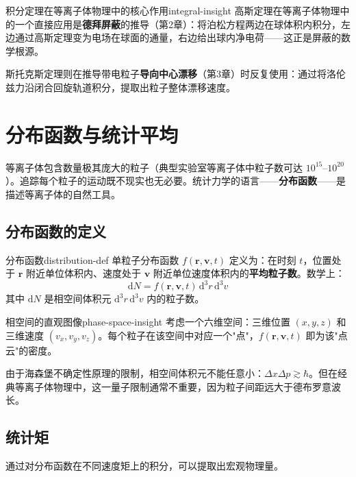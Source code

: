 \documentclass[12pt,a4paper,openany,oneside]{book}
\newcommand{\diff}{\mathrm{d}}
\newcommand{\vect}[1]{\bm{#1}}
\newcommand{\difficulty}[1]{\marginnote{\hfill\textcolor{coverMid!80}{\rule[-0.1em]{2pt}{0.9em}}\,\textcolor{coverMid}{\footnotesize\textbf{[#1]}}}}
\begin{document}
\begin{insight}{积分定理在等离子体物理中的核心作用}{integral-insight}
高斯定理在等离子体物理中的一个直接应用是\textbf{德拜屏蔽}的推导（第2章）：将泊松方程两边在球体积内积分，左边通过高斯定理变为电场在球面的通量，右边给出球内净电荷——这正是屏蔽的数学根源。

斯托克斯定理则在推导带电粒子\textbf{导向中心漂移}（第3章）时反复使用：通过将洛伦兹力沿闭合回旋轨道积分，提取出粒子整体漂移速度。
\end{insight}

\section{分布函数与统计平均}\difficulty{基础}

等离子体包含数量极其庞大的粒子（典型实验室等离子体中粒子数可达 $10^{15}$--$10^{20}$）。追踪每个粒子的运动既不现实也无必要。统计力学的语言——\textbf{分布函数}——是描述等离子体的自然工具。

\subsection{分布函数的定义}

\begin{definition}{分布函数}{distribution-def}
单粒子分布函数 $f(\vect{r},\vect{v},t)$ 定义为：在时刻 $t$，位置处于 $\vect{r}$ 附近单位体积内、速度处于 $\vect{v}$ 附近单位速度体积内的\textbf{平均粒子数}。数学上：
\[
\diff N = f(\vect{r},\vect{v},t)\,\diff^3r\,\diff^3v
\]
其中 $\diff N$ 是相空间体积元 $\diff^3r\,\diff^3v$ 内的粒子数。
\end{definition}

\begin{insight}{相空间的直观图像}{phase-space-insight}
考虑一个六维空间：三维位置 $(x,y,z)$ 和三维速度 $(v_x,v_y,v_z)$。每个粒子在该空间中对应一个"点"，$f(\vect{r},\vect{v},t)$ 即为该"点云"的密度。

由于海森堡不确定性原理的限制，相空间体积元不能任意小：$\Delta x\Delta p \gtrsim \hbar$。但在经典等离子体物理中，这一量子限制通常不重要，因为粒子间距远大于德布罗意波长。
\end{insight}

\subsection{统计矩}

通过对分布函数在不同速度矩上的积分，可以提取出宏观物理量。
\end{document}
